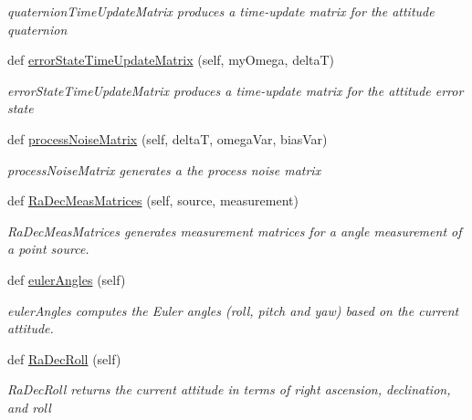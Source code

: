 \begin{DoxyCompactItemize}
\begin{DoxyCompactList}\small\item\em quaternion\+Time\+Update\+Matrix produces a time-\/update matrix for the attitude quaternion \end{DoxyCompactList}\item 
def \hyperlink{classmodest_1_1substates_1_1Attitude_1_1Attitude_a87070a8f76a3bf2d773c9f7341824060}{error\+State\+Time\+Update\+Matrix} (self, my\+Omega, deltaT)
\begin{DoxyCompactList}\small\item\em error\+State\+Time\+Update\+Matrix produces a time-\/update matrix for the attitude error state \end{DoxyCompactList}\item 
def \hyperlink{classmodest_1_1substates_1_1Attitude_1_1Attitude_afbf0348644aa50579d05001b4e86714e}{process\+Noise\+Matrix} (self, deltaT, omega\+Var, bias\+Var)
\begin{DoxyCompactList}\small\item\em process\+Noise\+Matrix generates a the process noise matrix \end{DoxyCompactList}\item 
def \hyperlink{classmodest_1_1substates_1_1Attitude_1_1Attitude_a63d3c91f0760ed505445718dcac21ea7}{Ra\+Dec\+Meas\+Matrices} (self, source, measurement)
\begin{DoxyCompactList}\small\item\em Ra\+Dec\+Meas\+Matrices generates measurement matrices for a angle measurement of a point source. \end{DoxyCompactList}\item 
def \hyperlink{classmodest_1_1substates_1_1Attitude_1_1Attitude_a2af6c8a76b84b0947694f0d214982a85}{euler\+Angles} (self)
\begin{DoxyCompactList}\small\item\em euler\+Angles computes the Euler angles (roll, pitch and yaw) based on the current attitude. \end{DoxyCompactList}\item 
def \hyperlink{classmodest_1_1substates_1_1Attitude_1_1Attitude_a39beb322b15bcaec0f6a70ffbce6308d}{Ra\+Dec\+Roll} (self)
\begin{DoxyCompactList}\small\item\em Ra\+Dec\+Roll returns the current attitude in terms of right ascension, declination, and roll \end{DoxyCompactList}\item 

\end{DoxyCompactItemize}
